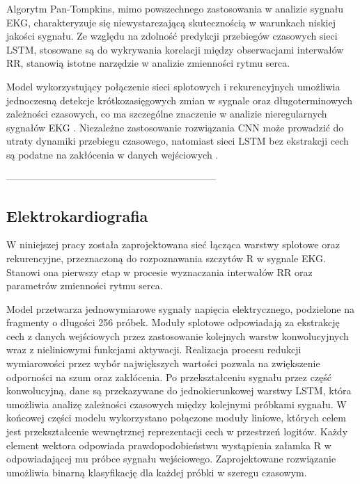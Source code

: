 \documentclass[journal]{IEEEtran}
\begin{document}
Algorytm Pan-Tompkins, mimo powszechnego zastosowania w analizie sygnału EKG, charakteryzuje się niewystarczającą skutecznością w warunkach niskiej jakości sygnału. Ze względu na zdolność predykcji przebiegów czasowych sieci LSTM, stosowane są do wykrywania korelacji między obserwacjami interwałów RR, stanowią istotne narzędzie w analizie zmienności rytmu serca.


Model wykorzystujący połączenie sieci splotowych i rekurencyjnych umożliwia jednoczesną detekcje krótkozasięgowych zmian w sygnale oraz długoterminowych zależności czasowych, co ma szczególne znaczenie w analizie nieregularnych sygnałów EKG \cite{2}. Niezależne zastosowanie rozwiązania CNN może prowadzić do utraty dynamiki przebiegu czasowego, natomiast sieci LSTM bez ekstrakcji cech są podatne na zakłócenia w danych wejściowych \cite{3}.

-----------------------------------------------------------------

\newpage
\subsection{Elektrokardiografia}
W niniejszej pracy została zaprojektowana sieć łącząca warstwy splotowe oraz rekurencyjne, przeznaczoną do rozpoznawania szczytów R w sygnale EKG. Stanowi ona pierwszy etap w procesie wyznaczania interwałów RR oraz parametrów zmienności rytmu serca.

Model przetwarza jednowymiarowe sygnały napięcia elektrycznego, podzielone na fragmenty o długości 256 próbek. Moduły splotowe odpowiadają za ekstrakcję cech z danych wejściowych przez zastosowanie kolejnych warstw konwolucyjnych wraz z nieliniowymi funkcjami aktywacji. Realizacja procesu redukcji wymiarowości przez wybór największych wartości pozwala na zwiększenie odporności na szum oraz zakłócenia. Po przekształceniu sygnału przez część konwolucyjną, dane są przekazywane do jednokierunkowej warstwy LSTM, która umożliwia analizę zależności czasowych między kolejnymi próbkami sygnału. W końcowej części modelu wykorzystano połączone moduły liniowe, których celem jest przekształcenie wewnętrznej reprezentacji cech w przestrzeń logitów. Każdy element wektora odpowiada prawdopodobieństwu wystąpienia załamka R w odpowiadającej mu próbce sygnału wejściowego. Zaprojektowane rozwiązanie umożliwia binarną klasyfikację dla każdej próbki w szeregu czasowym.
\end{document}
